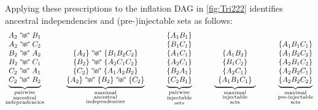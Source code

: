 Applying these prescriptions to the inflation DAG in \cref{fig:Tri222} identifies 
 ancestral independencies and (pre-)injectable sets as follows:
\begin{align}\label{eq:basicsetup222}
{\underbrace{\begin{matrix}
A_2\aindep B_1\\
A_2\aindep C_2\\
B_2\aindep A_2\\
B_2\aindep C_1\\
C_2\aindep A_1\\
C_2\aindep B_2
\end{matrix}}_{\substack{\text{pairwise}\\\text{ancestral}\\\text{independencies}}}}
\qquad\quad
{\underbrace{\begin{matrix}
\\ \\
\brackets{A_2}\aindep \brackets{B_1 B_2 C_2}\\
\brackets{B_2}\aindep \brackets{A_2 C_1 C_2}\\
\brackets{C_2}\aindep \brackets{A_1 A_2 B_2}\\
\brackets{A_2}\aindep \brackets{B_2}\aindep \brackets{C_2}
\end{matrix}}_{\substack{\text{maximal}\\\text{ancestral}\\\text{independencies}}}}
\qquad\quad
{\underbrace{\begin{matrix}
\brackets{ A_1 B_1 }\\
\brackets{ B_1 C_1 }\\
\brackets{ A_1 C_1 }\\
\brackets{ A_2 C_1 }\\
\brackets{ B_2 A_1 }\\
\brackets{ C_2 B_1 }\\
\end{matrix}}_{\substack{\text{pairwise}\\\text{injectable}\\\text{sets}}}}
\qquad\quad
{\underbrace{\begin{array}{c}
\\ \\
\brackets{A_1 B_2}\\
\brackets{B_1 C_2}\\
\brackets{A_2 C_1}\\
\brackets{A_1 B_1 C_1}
\end{array}}_{\substack{\text{maximal}\\\text{injectable}\\\text{sets}}}}
\qquad\quad
{\underbrace{\begin{matrix}
\\
\brackets{A_1 B_1 C_1} \\
\brackets{A_1 B_2 C_2} \\
\brackets{A_2 B_1 C_2} \\
\brackets{A_2 B_2 C_1} \\
\brackets{A_2 B_2 C_2}
\end{matrix}}_{\substack{\text{maximal}\\\text{pre-injectable}\\\text{sets}}}}
\end{align}
